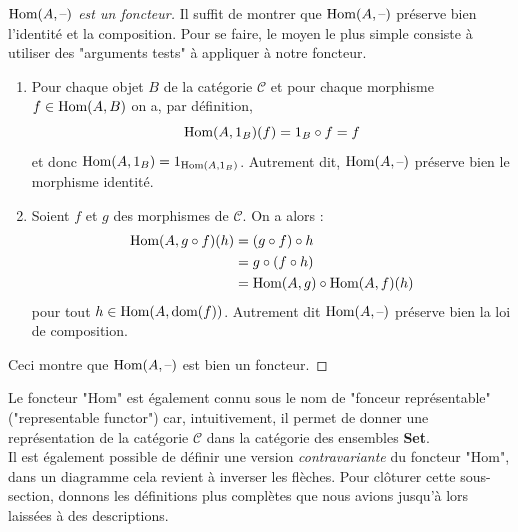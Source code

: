 \documentclass{article}
\begin{document}
\begin{proof}[$\text{Hom}(A, \text{--})$ est un foncteur]{}
Il suffit de montrer que $\text{Hom}(A, \text{--})$ préserve bien l'identité et la composition. Pour se faire, le moyen le plus simple consiste à utiliser des "arguments tests" à appliquer à notre foncteur.
\begin{enumerate}
    \item Pour chaque objet $B$ de la catégorie $\mathcal C$ et pour chaque morphisme $f\in\text{Hom}(A, B)$ on a, par définition,
    $$
    \text{Hom}(A, 1_B)(f)=1_B\circ f=f
    $$
    et donc $\text{Hom}(A, 1_B)=1_{\text{Hom}(A, 1_B)}$. Autrement dit, $\text{Hom}(A, \text{--})$ préserve bien le morphisme identité.
    \item Soient $f$ et $g$ des morphismes de $\mathcal C$. On a alors :
    \begin{equation*}
    \begin{aligned}
        \text{Hom}(A, g\circ f)(h)&=(g\circ f)\circ h\\
                            &=g\circ(f\circ h)\\
                            &=\text{Hom}(A, g)\circ\text{Hom}(A, f)(h)
    \end{aligned}
    \end{equation*}
    pour tout $h\in\text{Hom}(A, \text{dom}(f))$. Autrement dit $\text{Hom}(A, \text{--})$ préserve bien la loi de composition.
\end{enumerate}
Ceci montre que $\text{Hom}(A,\text{--})$ est bien un foncteur.
\end{proof}

Le foncteur "Hom" est également connu sous le nom de "fonceur représentable" ("representable functor") car, intuitivement, il permet de donner une représentation de la catégorie $\mathcal C$ dans la catégorie des ensembles \textbf{Set}.\\

Il est également possible de définir une version \textit{contravariante} du foncteur "Hom", dans un diagramme cela revient à inverser les flèches. Pour clôturer cette sous-section, donnons les définitions plus complètes que nous avions jusqu'à lors laissées à des descriptions.
\end{document}
